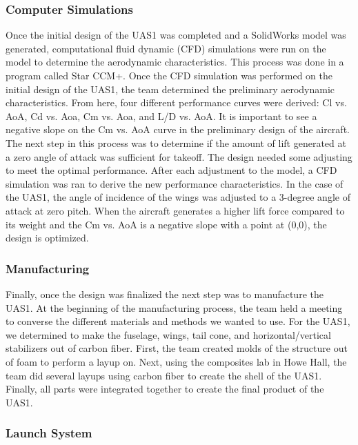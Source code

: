 \documentclass{article}
\begin{document}
\subsubsection{Computer Simulations}

Once the initial design of the UAS1 was completed and a SolidWorks model was generated, computational fluid dynamic (CFD) simulations were run on the model to determine the aerodynamic characteristics. This process was done in a program called Star CCM+. Once the CFD simulation was performed on the initial design of the UAS1, the team determined the preliminary aerodynamic characteristics. From here, four different performance curves were derived: Cl vs. AoA, Cd vs. Aoa, Cm vs. Aoa, and L/D vs. AoA. It is important to see a negative slope on the Cm vs. AoA curve in the preliminary design of the aircraft. The next step in this process was to determine if the amount of lift generated at a zero angle of attack was sufficient for takeoff. The design needed some adjusting to meet the optimal performance. After each adjustment to the model, a CFD simulation was ran to derive the new performance characteristics. In the case of the UAS1, the angle of incidence of the wings was adjusted to a 3-degree angle of attack at zero pitch. When the aircraft generates a higher lift force compared to its weight and the Cm vs. AoA is a negative slope with a point at (0,0), the design is optimized.

\subsubsection{Manufacturing}

Finally, once the design was finalized the next step was to manufacture the UAS1. At the beginning of the manufacturing process, the team held a meeting to converse the different materials and methods we wanted to use. For the UAS1, we determined to make the fuselage, wings, tail cone, and horizontal/vertical stabilizers out of carbon fiber. First, the team created molds of the structure out of foam to perform a layup on. Next, using the composites lab in Howe Hall, the team did several layups using carbon fiber to create the shell of the UAS1. Finally, all parts were integrated together to create the final product of the UAS1. 

\subsubsection{Launch System}
\end{document}
